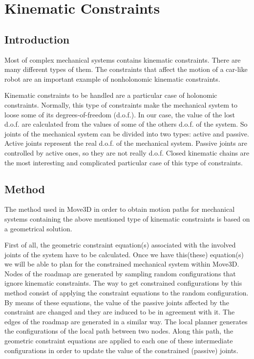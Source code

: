 \chapter{Kinematic Constraints}
\label{Constraints}

\section{Introduction}

Most of complex mechanical systems contains kinematic constraints.
There are many different types of them. The constraints that affect
the motion of a car-like robot are an important example of
nonholonomic kinematic constraints.

Kinematic constraints to be handled are a particular case of holonomic
constraints.  Normally, this type of constraints make the mechanical
system to loose some of its degrees-of-freedom (d.o.f.). In our case,
the value of the lost d.o.f. are calculated from the values of some of
the others d.o.f. of the system. So joints of the mechanical system
can be divided into two types: active and passive. Active joints
represent the real d.o.f. of the mechanical system. Passive joints are
controlled by active ones, so they are not really d.o.f. Closed
kinematic chains are the most interesting and complicated particular
case of this type of constraints.


\section{Method}

The method used in Move3D in order to obtain motion paths for
mechanical systems containing the above mentioned type of kinematic
constraints is based on a geometrical solution.

First of all, the geometric constraint
equation(s) associated with the involved joints of the system have to
be calculated. Once we have this(these) equation(s) we will
be able to plan for the constrained mechanical system within
Move3D. Nodes of the roadmap are generated by sampling random
configurations that ignore kinematic constraints. The way to get
constrained configurations by this method consist of applying the constraint
equations to the random configuration. By means of these equations,
the value of the passive joints affected by the constraint are changed
and they are induced to be in agreement with it. The edges of the roadmap are
generated in a similar way. The local planner generates the
configurations of the local path between two nodes. Along this path,
the geometric constraint equations are applied to each one of these
intermediate configurations in order to update the value of the
constrained (passive) joints.

